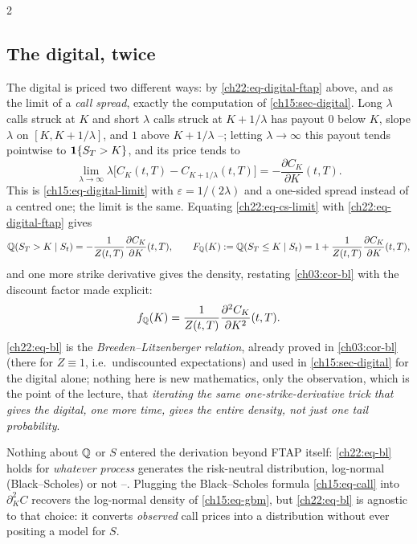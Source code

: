 \begin{paracol}{2}
\subsection{The digital, twice}\label{ch22:sec-digital-twice}
The digital is priced two different ways: by \eqref{ch22:eq-digital-ftap} above, and as the limit of a
\emph{call spread}, exactly the computation of \cref{ch15:sec-digital}. Long $\lambda$ calls struck at
$K$ and short $\lambda$ calls struck at $K+1/\lambda$ has payout $0$ below $K$, slope $\lambda$ on
$[K,K+1/\lambda]$, and $1$ above $K+1/\lambda$ --; letting
$\lambda\to\infty$ this payout tends pointwise to $\mathbf{1}\{S_T>K\}$, and its price tends to
\begin{equation}\label{ch22:eq-cs-limit}
  \lim_{\lambda\to\infty}\lambda\bigl[C_K(t,T)-C_{K+1/\lambda}(t,T)\bigr] = -\frac{\partial C_K}{\partial K}(t,T).
\end{equation}
This is \eqref{ch15:eq-digital-limit} with $\varepsilon=1/(2\lambda)$ and a one-sided spread instead of
a centred one; the limit is the same. Equating \eqref{ch22:eq-cs-limit} with
\eqref{ch22:eq-digital-ftap} gives
\begin{equation}\label{ch22:eq-cdf}
  \mathbb{Q}(S_T>K\mid S_t) = -\frac{1}{Z(t,T)}\frac{\partial C_K}{\partial K}(t,T),
  \qquad
  F_{\mathbb{Q}}(K):=\mathbb{Q}(S_T\le K\mid S_t) = 1+\frac{1}{Z(t,T)}\frac{\partial C_K}{\partial K}(t,T),
\end{equation}
and one more strike derivative gives the density, restating \cref{ch03:cor-bl} with the discount factor
made explicit:
\begin{equation}\label{ch22:eq-bl}
  f_{\mathbb{Q}}(K) = \frac{1}{Z(t,T)}\frac{\partial^2 C_K}{\partial K^2}(t,T).
\end{equation}
\eqref{ch22:eq-bl} is the \emph{Breeden--Litzenberger relation}, already proved in
\cref{ch03:cor-bl} (there for $Z\equiv1$, i.e.\ undiscounted expectations) and used in
\cref{ch15:sec-digital} for the digital alone; nothing here is new mathematics, only the
observation, which is the point of the lecture, that \emph{iterating the same one-strike-derivative
trick that gives the digital, one more time, gives the entire density, not just one tail probability}.

\begin{intuition}
Nothing about $\mathbb{Q}$ or $S$ entered the derivation beyond FTAP itself: \eqref{ch22:eq-bl} holds for
\emph{whatever process} generates the risk-neutral distribution, log-normal (Black--Scholes) or not
--. Plugging the Black--Scholes formula \eqref{ch15:eq-call} into
$\partial^2_KC$ recovers the log-normal density of \cref{ch15:eq-gbm}, but \eqref{ch22:eq-bl} is
agnostic to that choice: it converts \emph{observed} call prices into a distribution without ever
positing a model for $S$.
\end{intuition}


\end{paracol}
